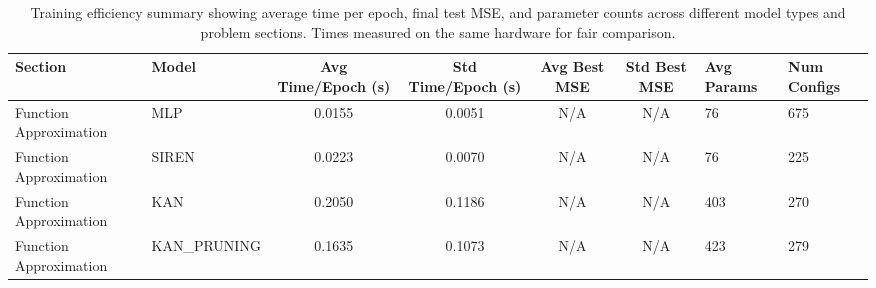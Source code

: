 \begin{table}
\caption{Training efficiency summary showing average time per epoch, final test MSE, and parameter counts across different model types and problem sections. Times measured on the same hardware for fair comparison.}
\label{tab:convergence_summary}
\begin{tabular}{|l|l|c|c|c|c|}
\toprule
Section & Model & Avg Time/Epoch (s) & Std Time/Epoch (s) & Avg Best MSE & Std Best MSE & Avg Params & Num Configs \\
\midrule
Function Approximation & MLP & 0.0155 & 0.0051 & N/A & N/A & 76 & 675 \\
Function Approximation & SIREN & 0.0223 & 0.0070 & N/A & N/A & 76 & 225 \\
Function Approximation & KAN & 0.2050 & 0.1186 & N/A & N/A & 403 & 270 \\
Function Approximation & KAN_PRUNING & 0.1635 & 0.1073 & N/A & N/A & 423 & 279 \\
\bottomrule
\end{tabular}
\end{table}
